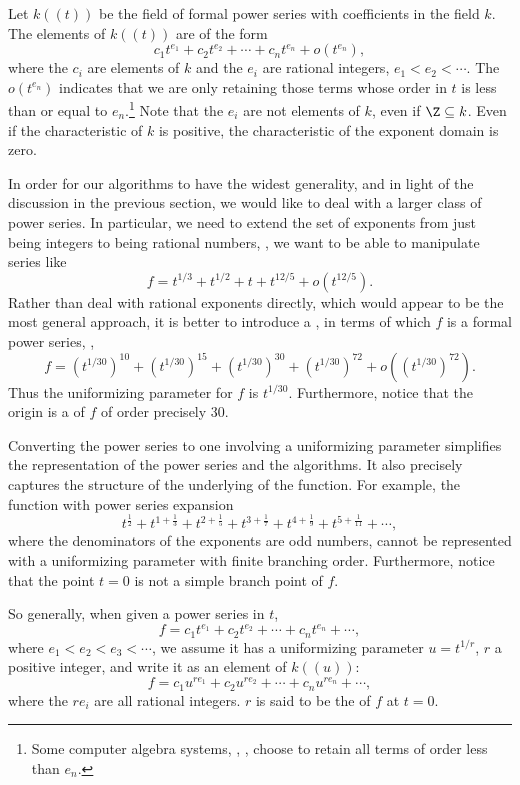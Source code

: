 Let $k((t))$ be the field of formal power series with coefficients in
the field $k$.  The 
elements of $k((t))$ are of the form
\begin{equation} \label{PS:Form:Eq}
c_1 t^{e_1} + c_2 t^{e_2} + \cdots + c_n t^{e_n} + o(t^{e_n}),
\end{equation}
where the $c_i$ are elements of $k$ and the $e_i$ are rational
integers, $e_1 < e_2 < \cdots$.  The $o(t^{e_n})$ indicates that we
are only retaining those terms whose order in $t$ is less than or
equal to $e_n$.\footnote{Some computer algebra systems, \eg, ,
choose to retain all terms of order less than $e_n$.} Note that the
$e_i$ are not elements of $k$, even if $\Z \subseteq k$.  Even if
the characteristic of $k$ is positive, the characteristic of the
exponent domain is zero.

In order for our algorithms to have the widest generality, and in
light of the discussion in the previous section, we would like to deal
with a larger class of power series. In particular, we need to extend
the set of exponents from just being integers to being rational
numbers,
\ie, we want to be able to manipulate series like
\begin{equation} \label{Sample:Series:Eq}
f = t^{1/3} + t^{1/2} + t + t^{12/5} + o(t^{12/5}).
\end{equation}
Rather than deal with rational exponents directly, which would appear
to be the most general approach, it is better to introduce a
, in terms of which $f$ is a formal power
series, \ie,
\[
f = (t^{1/30})^{10} + (t^{1/30})^{15} + (t^{1/30})^{30} +
(t^{1/30})^{72} + o((t^{1/30})^{72}).
\]
Thus the uniformizing parameter for $f$ is $t^{1/30}$.  Furthermore,
notice that the origin is a  of $f$ of order precisely
$30$.

Converting the power series to one involving a uniformizing parameter
simplifies the representation of the power series and the algorithms.
It also precisely captures the structure of the underlying
 of the function.  For example, the function
with power series expansion
\[
t^{\frac{1}{2}} + t^{1+\frac{1}{3}} + t^{2+\frac{1}{5}} 
   + t^{3+\frac{1}{7}} + t^{4+\frac{1}{9}} + t^{5+\frac{1}{11}} +
\cdots,
\]
where the denominators of the exponents are odd numbers, cannot be
represented with a uniformizing parameter with finite branching order.
Furthermore, notice that the point $t = 0$ is not a simple branch
point of $f$.  

So generally, when given a power series in $t$, 
\[
f  = c_1 t^{e_1} + c_2 t^{e_2} + \cdots + c_n t^{e_n} + \cdots,
\]
where $e_1 < e_2 < e_3 < \cdots$, we assume it has a
uniformizing parameter $u = t^{1/r}$, $r$ a positive integer, and
write it as an element of $k((u))$:
\[
f = c_1 u^{r e_1} + c_2 u^{r e_2} + \cdots + c_n u^{r e_n} + \cdots,
\]
where the $r e_i$ are all rational integers.  $r$ is said to be the
 of $f$ at $t=0$.

